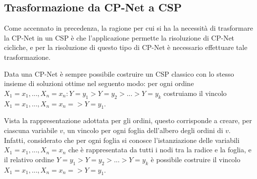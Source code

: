 \subsection{Trasformazione da CP-Net a CSP}
Come accennato in precedenza, la ragione per cui si ha la necessità di
trasformare la CP-Net in un CSP è che l'applicazione permette la risoluzione di
CP-Net cicliche, e per la risoluzione di questo tipo di CP-Net è necessario
effettuare tale trasformazione.

Data una CP-Net è sempre possibile costruire un CSP classico con lo stesso
insieme di soluzioni ottime nel seguento modo: per ogni ordine $X_1=x_1, ...,
X_n=x_n: Y=y_1 > Y=y_2 > ... > Y=y_k$ costruiamo il vincolo $X_1=x_1, ..., X_n=x_n
=> Y=y_1$.

Vista la rappresentazione adottata per gli ordini, questo corrisponde a creare, per
ciascuna variabile $v$, un vincolo per ogni foglia dell'albero degli ordini di $v$.
Infatti, considerato che per ogni foglia si conosce l'istanziazione delle variabili
$X_1=x_1, ..., X_n=x_n$ che è rappresentata da tutti i nodi tra la radice e la
foglia, e il relativo ordine $Y=y_1 > Y=y_2 > ... > Y=y_k$
è possibile costruire il vincolo $X_1=x_1, ..., X_n=x_n => Y=y_1$.
